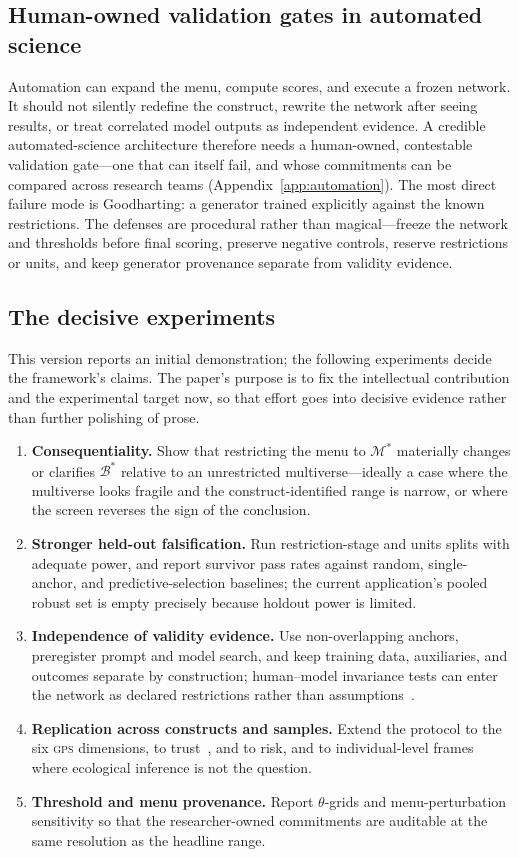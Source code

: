 \documentclass[10pt,letterpaper]{article}
\newcommand{\GPS}{\textsc{gps}}
\newcommand{\M}{\ensuremath{\mathcal{M}}}
\newcommand{\Bset}{\mathcal{B}}
\begin{document}
\subsection{Human-owned validation gates in automated science}
Automation can expand the menu, compute scores, and execute a frozen network.
It should not silently redefine the construct, rewrite the network after seeing results, or treat correlated model outputs as independent evidence.
A credible automated-science architecture therefore needs a human-owned, contestable validation gate---one that can itself fail, and whose commitments can be compared across research teams (Appendix~\ref{app:automation}).
The most direct failure mode is Goodharting: a generator trained explicitly against the known restrictions.
The defenses are procedural rather than magical---freeze the network and thresholds before final scoring, preserve negative controls, reserve restrictions or units, and keep generator provenance separate from validity evidence.

\subsection{The decisive experiments}
\label{sec:agenda}
This version reports an initial demonstration; the following experiments decide the framework's claims.
The paper's purpose is to fix the intellectual contribution and the experimental target now, so that effort goes into decisive evidence rather than further polishing of prose.
\begin{enumerate}[label=(\roman*)]
\item \textbf{Consequentiality.} Show that restricting the menu to $\M^*$ materially changes or clarifies $\Bset^*$ relative to an unrestricted multiverse---ideally a case where the multiverse looks fragile and the construct-identified range is narrow, or where the screen reverses the sign of the conclusion.
\item \textbf{Stronger held-out falsification.} Run restriction-stage and units splits with adequate power, and report survivor pass rates against random, single-anchor, and predictive-selection baselines; the current application's pooled robust set is empty precisely because holdout power is limited.
\item \textbf{Independence of validity evidence.} Use non-overlapping anchors, preregister prompt and model search, and keep training data, auxiliaries, and outcomes separate by construction; human--model invariance tests can enter the network as declared restrictions rather than assumptions~\cite{zeinfeld2026}.
\item \textbf{Replication across constructs and samples.} Extend the protocol to the six \GPS{} dimensions, to trust~\cite{glaser2000,sapienza2013,butler2016}, and to risk, and to individual-level frames where ecological inference is not the question.
\item \textbf{Threshold and menu provenance.} Report $\theta$-grids and menu-perturbation sensitivity so that the researcher-owned commitments are auditable at the same resolution as the headline range.
\end{enumerate}
\end{document}
